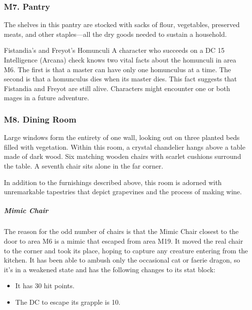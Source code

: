 \documentclass[10pt,a4paper,twoside,bg=print,twocolumn,openany,nodeprecatedcode]{dndbook}
\begin{document}
\subsubsection{M7. Pantry}
The shelves in this pantry are stocked with sacks of flour, vegetables, preserved meats, and other staples—all the dry goods needed to sustain a household.

\begin{DndSidebar}[float=!b]{Fistandia's and Freyot's Homunculi}
A character who succeeds on a DC 15 Intelligence (Arcana) check knows two vital facts about the homunculi in area M6. The first is that a master can have only one homunculus at a time. The second is that a homunculus dies when its master dies. This fact suggests that Fistandia and Freyot are still alive. Characters might encounter one or both mages in a future adventure.



\end{DndSidebar}

\subsubsection{M8. Dining Room}
\begin{DndReadAloud}{}
Large windows form the entirety of one wall, looking out on three planted beds filled with vegetation. Within this room, a crystal chandelier hangs above a table made of dark wood. Six matching wooden chairs with scarlet cushions surround the table. A seventh chair sits alone in the far corner.

\end{DndReadAloud}

In addition to the furnishings described above, this room is adorned with unremarkable tapestries that depict grapevines and the process of making wine.

\subparagraph{Mimic Chair}
The reason for the odd number of chairs is that the Mimic Chair closest to the door to area M6 is a mimic that escaped from area M19. It moved the real chair to the corner and took its place, hoping to capture any creature entering from the kitchen. It has been able to ambush only the occasional cat or faerie dragon, so it's in a weakened state and has the following changes to its stat block:


\begin{itemize}
\item It has 30 hit points.
\item The DC to escape its grapple is 10.
\end{itemize}
\end{document}
